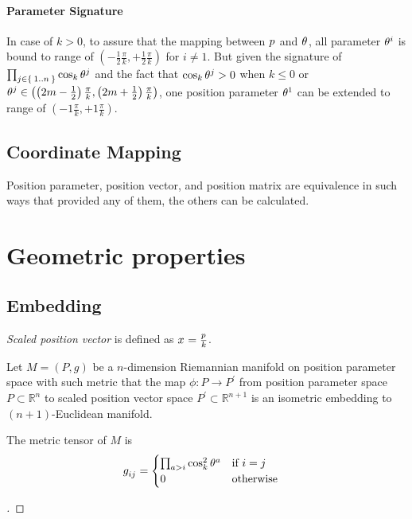 \documentclass[stu, babel, american, biblatex, a4paper, draftall]{apa7}
\begin{document}
\paragraph{Parameter Signature}
    In case of $k>0$,
    to assure that the mapping between $\tensor{p}{}$ and $\tensor{\theta}{}$,
    all parameter $\tensor{\theta}{^i}$ is bound to range of $\left(-\frac{1}{2}\frac{\pi}{k},+\frac{1}{2}\frac{\pi}{k}\right)$ for $i\ne1$.
    But given the signature of $\prod_{j\in\Set{1..n}}{\cos_k{\tensor{\theta}{^j}}}$
    and the fact that $\cos_k{\tensor{\theta}{^j}}>0$
    when $k\leq 0$ or $\tensor{\theta}{^j}\in\left(\left(2m-\frac{1}{2}\right)\frac{\pi}{k},\left(2m+\frac{1}{2}\right)\frac{\pi}{k}\right)$,
    one position parameter $\tensor{\theta}{^1}$ can be extended to range of $\left(-1\frac{\pi}{k},+1\frac{\pi}{k}\right)$.
\subsection{Coordinate Mapping}
\begin{corollary}\label{PositionEquivalence}
    Position parameter, position vector, and position matrix
    are equivalence in such ways that
    provided any of them, the others can be calculated.
\end{corollary}
\section{Geometric properties}
\subsection{Embedding}
\begin{definition}\label{ScaledPositionVector}
    \textit{Scaled position vector} is defined as $\tensor{x}{} = \frac{\tensor{p}{}}{k}$.
\end{definition}
\begin{definition}\label{Embedding}
    Let $M=\left(P,g\right)$ be a $n$-dimension Riemannian manifold
    on position parameter space with such metric that
    the map $\phi:P\to P^{\prime}$
    from position parameter space $P\subset\mathbb{R}^{n}$
    to scaled position vector space $P^{\prime}\subset\mathbb{R}^{n+1}$
    is an isometric embedding to $\left(n+1\right)$-Euclidean manifold.
\end{definition}
\begin{lemma}\label{MetricTensor}
    The metric tensor of $M$ is
    \begin{align*}
        \tensor{g}{_i_j} & =
        \begin{cases}
            \prod_{a>i}{\cos_k^2{\tensor{\theta}{^a}}} & \text{if $i=j$}  \\
            0                                          & \text{otherwise} \\
        \end{cases}
    \end{align*}
\end{lemma}
\begin{proof}[]
    \skipped
\end{proof}
\end{document}
